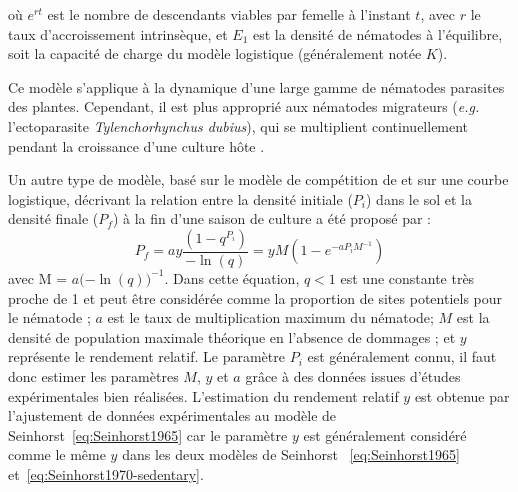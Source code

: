	où $e^{rt}$ est le nombre de descendants viables par femelle à l'instant $t$, avec $r$ le taux d'accroissement intrinsèque, et $E_1$ est la densité de nématodes à l'équilibre, soit la capacité de charge du modèle logistique (généralement notée $K$). 
	
	Ce modèle s'applique à la dynamique d'une large gamme de nématodes parasites des plantes. Cependant, il est plus approprié aux nématodes migrateurs (\textit{e.g.} l'ectoparasite \textit{Tylenchorhynchus dubius}), qui se multiplient continuellement pendant la croissance d'une culture hôte \citep{Seinhorst1970}. 
		
	Un autre type de modèle,  basé sur le modèle de compétition de
	\citet{Nicholson1935} et sur une courbe logistique,  décrivant la relation entre la densité initiale ($P_i$) dans le sol  et la densité finale ($P_f$) à  la fin d'une saison de culture a été proposé par  \citet{Seinhorst1967c,Seinhorst1970,Seinhorst1986} :
	\begin{equation}
		P_f= a y\frac{ \left(1-q^{P_i}\right)}{-\ln(q)} = y M  \left(1- e^{-a P_i M^{-1} }\right)
		\label{eq:Seinhorst1970-sedentary}
	\end{equation}
	avec M = $a {(-\ln(q)})^{-1}$.
Dans cette   équation, $q<1$ est une constante très proche de 1  et peut être considérée comme la proportion de sites  potentiels pour le nématode ;
$a$ est le taux de multiplication maximum du nématode;  
$M$ est la densité de population maximale théorique en l'absence
de dommages ; et $y$ représente le rendement relatif. Le paramètre $P_i$ est généralement connu, il faut donc estimer les paramètres $M$, $y$ et $a$ grâce à des données issues d'études expérimentales bien réalisées. L'estimation du rendement relatif $y$ est obtenue par l'ajustement de données expérimentales au modèle de Seinhorst~\eqref{eq:Seinhorst1965} car le paramètre $y$  est généralement considéré comme le même $y$ dans les deux modèles de Seinhorst~ \eqref{eq:Seinhorst1965} et~\eqref{eq:Seinhorst1970-sedentary}. 
	
